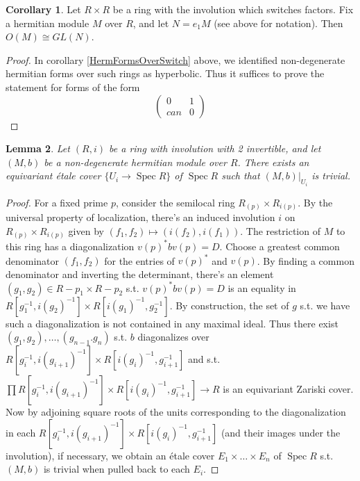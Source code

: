 \documentclass[draftthesis,tocnosub,noragright,centerchapter,10pt]{uiucthesis2009}
\DeclareMathOperator{\Spec}{Spec}
\theoremstyle{plain}
\newtheorem{lemma}{Lemma}
\theoremstyle{definition}
\newtheorem{corollary}[lemma]{Corollary}
\begin{document}
\begin{corollary}
Let $R \times R$ be a ring with the involution which switches
factors. Fix a hermitian module $M$ over $R$, and let $N = e_1M$ (see
above for notation). Then
$O(M) \cong GL(N)$.
\end{corollary}

\begin{proof}
In corollary \ref{HermFormsOverSwitch} above, we identified
non-degenerate hermitian
forms over such rings as hyperbolic. Thus it suffices to prove the
statement for forms of the form 
\[
\begin{pmatrix}
0 & 1\\
can & 0
\end{pmatrix}
\]
\end{proof}

\begin{lemma}
Let $(R,i)$ be a ring with involution with 2 invertible, and let
$(M,b)$ be a non-degenerate hermitian module over $R$. There exists an equivariant
\'etale cover $\{U_i \rightarrow \Spec R\}$ of $\Spec R$ such that
$(M,b)|_{U_i}$ is trivial.
\end{lemma}

\begin{proof}
For a fixed prime $p$, consider the semilocal ring $R_{(p)} \times
R_{i(p)}$. By the universal property of localization, there's an induced involution $i$ on  $R_{(p)} \times
R_{i(p)}$ given by $(f_1,f_2) \mapsto (i(f_2),i(f_1))$. The
restriction of $M$ to this ring has a diagonalization $v(p)^*bv(p) =
D$. Choose a greatest common denominator $(f_1,f_2)$ for the entries of $v(p)^*$
and $v(p)$. By finding a common denominator and inverting the
determinant, there's an element $(g_1,g_2) \in R-p_1 \times R-p_2$
s.t. $v(p)^*bv(p) = D$ is an equality in $R[g_1^{-1},i(g_2)^{-1}] \times
R[i(g_1)^{-1},g_2^{-1}]$. By construction, the set of $g$ s.t. we
have such a diagonalization is not contained in any maximal
ideal. Thus there exist $(g_1,g_2),\dots,(g_{n-1}.g_n)$ s.t. $b$
diagonalizes over $R[g_i^{-1},i(g_{i+1})^{-1}] \times
R[i(g_i)^{-1},g_{i+1}^{-1}]$ and s.t. $\prod R[g_i^{-1},i(g_{i+1})^{-1}] \times
R[i(g_i)^{-1},g_{i+1}^{-1}] \rightarrow R$ is an equivariant Zariski
cover. Now by adjoining square roots of the units corresponding to the
diagonalization in each $R[g_i^{-1},i(g_{i+1})^{-1}] \times
R[i(g_i)^{-1},g_{i+1}^{-1}]$ (and their images under the
involution), if necessary, we obtain an \'etale cover $E_1 \times
\dots \times E_n$ of $\Spec R$ s.t. $(M,b)$ is trivial when pulled
back to each $E_i$. 
\end{proof}
\end{document}
